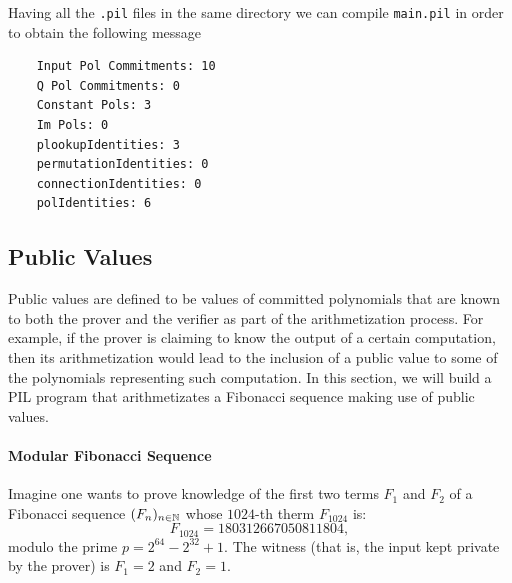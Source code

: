 Having all the \texttt{.pil} files in the same directory we can compile \texttt{main.pil} in order to obtain the following message 

\begin{lstlisting}
    Input Pol Commitments: 10
    Q Pol Commitments: 0
    Constant Pols: 3
    Im Pols: 0
    plookupIdentities: 3
    permutationIdentities: 0
    connectionIdentities: 0
    polIdentities: 6
\end{lstlisting}




\subsection{Public Values}

Public values are defined to be values of committed polynomials that are known to both the prover and the verifier as part of the arithmetization process. For example, if the prover is claiming to know the output of a certain computation, then its arithmetization would lead to the inclusion of a public value to some of the polynomials representing such computation. In this section, we will build a PIL program that arithmetizates a Fibonacci sequence making use of public values.

\paragraph{Modular Fibonacci Sequence} Imagine one wants to prove knowledge of the first two terms $F_1$ and $F_2$ of a Fibonacci sequence $(F_n)_{n\in\mathbb{N}}$ whose $1024$-th therm $F_{1024}$ is:
\[
F_{1024} = 180312667050811804,
\]
modulo the prime $p = 2^{64} - 2^{32} + 1$. The witness (that is, the input kept private by the prover) is $F_1 = 2$ and $F_2 = 1$. 

